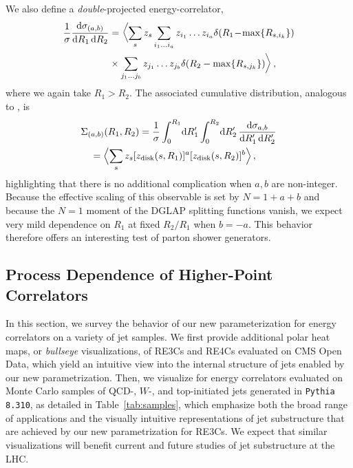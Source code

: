 We also define a \emph{double}-projected energy-correlator,
\begin{align}
    \label{eq:double_projected}
    \frac{1}{\sigma}
    \frac{\dd \sigma_{(a, b)}}{\dd R_1\, \dd R_2}
    &=
    \biggl\langle \sum_{\izero} z_{\izero}
    \sum_{i_1 \dots i_{a}}
    z_{i_1} \dots z_{i_{a}}
    \delta(R_1 \!-\! \max\{R_{\izero,i_k}\})
    \notag
    \\
    & \times
    \sum_{j_1 \dots j_{b}}
    z_{j_1} \dots z_{j_{b}}
    \delta (R_2 - \max\{R_{\izero,j_k}\}) \biggr\rangle
    \,,
\end{align}
where we again take $R_1>R_2$.
%
The associated cumulative distribution, analogous to , is
\begin{align}
    \label{eq:double_projected_cml}
    &
    \Sigma_{(a,b)}(R_1,R_2)
    =
    \frac{1}{\sigma}
    \int_0^{R_1}
    \!
    \dd R_1'   \int_0^{R_2}
    \!
    \dd R_2'
    \,
    \frac{\dd \sigma_{a,b}}{\dd R_1'\, \dd R_2'}
    \notag
    \\
    & \quad
    =
    \Bigl\langle \sum_{\izero}
    z_{\izero}
    [z_{\rm disk}(\izero,R_1)]^a [z_{\rm disk}(\izero,R_2)]^b \Bigr\rangle
    \,,
\end{align}
highlighting that there is no additional complication when $a,b$ are non-integer.
%
Because the effective scaling of this observable is set by $N = 1+a+b$ and because the $N= 1$ moment of the DGLAP splitting functions vanish, we expect very mild dependence on $R_1$ at fixed $R_2/R_1$ when $b = -a$.
%
This behavior therefore offers an interesting test of parton shower generators.



\subsection{Process Dependence of Higher-Point Correlators}
\label{sec:enc-pheno}

In this section, we survey the behavior of our new parameterization for energy correlators on a variety of jet samples.
%
We first provide additional polar heat maps, or \textit{bullseye} visualizations, of RE3Cs and RE4Cs evaluated on CMS Open Data, which yield an intuitive view into the internal structure of jets enabled by our new parametrization.
%
Then, we visualize for energy correlators evaluated on Monte Carlo samples of QCD-, \(W\)-, and top-initiated jets generated in \texttt{Pythia 8.310}, as detailed in Table~\ref{tab:samples}, which emphasize both the broad range of applications and the visually intuitive representations of jet substructure that are achieved by our new parametrization for RE3Cs.
%
We expect that similar visualizations will benefit current and future studies of jet substructure at the LHC.



